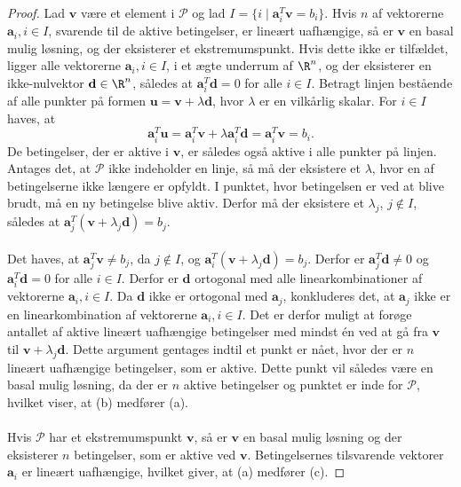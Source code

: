 \begin{proof}
Lad $\textbf{v}$ være et element i $\mathcal{P}$ og lad $I = \{ i \mid \textbf{a}_i^T\textbf{v} = b_i \}$.
Hvis $n$ af vektorerne  $\textbf{a}_i, i \in I$, svarende til de aktive betingelser, er lineært uafhængige, så er $\textbf{v}$ en basal mulig løsning, og der eksisterer et ekstremumspunkt.
Hvis dette ikke er tilfældet, ligger alle vektorerne $\textbf{a}_i, i \in I$, i et ægte underrum af $\R^n$, og der eksisterer en ikke-nulvektor $\textbf{d} \in \R^n$, således at $\textbf{a}_i^T\textbf{d} = 0$ for alle $i \in I$.
Betragt linjen bestående af alle punkter på formen $\textbf{u} = \textbf{v} + \lambda \textbf{d}$, hvor $\lambda$ er en vilkårlig skalar.
For $i \in I$ haves, at $$\textbf{a}_i^T\textbf{u} = \textbf{a}_i^T\textbf{v} + \lambda \textbf{a}_i^T\textbf{d} = \textbf{a}_i^T\textbf{v} = b_i.$$
De betingelser, der er aktive i $\textbf{v}$, er således også aktive i alle punkter på linjen.
Antages det, at $\mathcal{P}$ ikke indeholder en linje, så må der eksistere et $\lambda$, hvor en af betingelserne ikke længere er opfyldt.
I punktet, hvor betingelsen er ved at blive brudt, må en ny betingelse blive aktiv.
Derfor må der eksistere et $\lambda_j$, $j \notin I$, således at $\textbf{a}_j^T (\textbf{v} + \lambda_j\textbf{d}) = b_j$.\\\\
%
Det haves, at $\textbf{a}_j^T\textbf{v} \neq b_j$, da $j \notin I$, og $\textbf{a}_i^T (\textbf{v} + \lambda_j\textbf{d}) = b_j$.
Derfor er $\textbf{a}_j^T\textbf{d} \neq 0$ og $\textbf{a}_i^T\textbf{d} = 0$ for alle $i \in I$.
Derfor er $\textbf{d}$ ortogonal med alle linearkombinationer af vektorerne $\textbf{a}_i, i\in I$.
Da $\textbf{d}$ ikke er ortogonal med $\textbf{a}_j$, konkluderes det, at $\textbf{a}_j$ ikke er en linearkombination af vektorerne $\textbf{a}_i, i \in I$.
Det er derfor muligt at forøge antallet af aktive lineært uafhængige betingelser med mindst én ved at gå fra $\textbf{v}$ til $\textbf{v} + \lambda_j\textbf{d}$.
Dette argument gentages indtil et punkt er nået, hvor der er $n$ lineært uafhængige betingelser, som er aktive.
Dette punkt vil således være en basal mulig løsning, da der er $n$ aktive betingelser og punktet er inde for $\mathcal{P}$, hvilket viser, at (b) medfører (a).\\\\
%
Hvis $\mathcal{P}$ har et ekstremumspunkt $\textbf{v}$, så er $\textbf{v}$ en basal mulig løsning og der eksisterer $n$ betingelser, som er aktive ved $\textbf{v}$.
Betingelsernes tilsvarende vektorer $\textbf{a}_i$ er lineært uafhængige, hvilket giver, at (a) medfører (c).

\end{proof}
